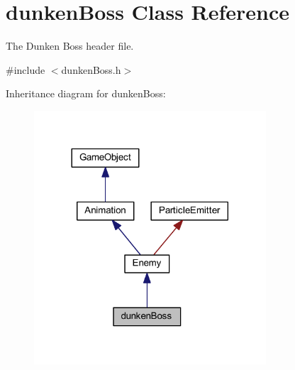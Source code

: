 \hypertarget{classdunken_boss}{\section{dunken\+Boss Class Reference}
\label{classdunken_boss}
}


The Dunken Boss header file.  




{\ttfamily \#include $<$dunken\+Boss.\+h$>$}



Inheritance diagram for dunken\+Boss\+:\nopagebreak
\begin{figure}[H]
\begin{center}
\leavevmode
\includegraphics[width=245pt]{classdunken_boss__inherit__graph}
\end{center}
\end{figure}


